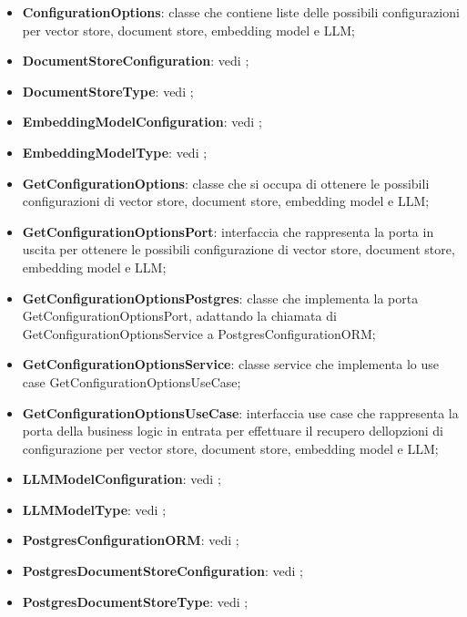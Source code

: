 \documentclass[10pt, a4paper]{article}
\begin{document}
       
\begin{itemize}
    \item \label{ConfigurationOptions}\textbf{ConfigurationOptions}: classe che contiene liste delle possibili configurazioni per vector store, document store, embedding model e LLM;
    \item \textbf{DocumentStoreConfiguration}: vedi ;
    \item \textbf{DocumentStoreType}: vedi ;
    \item \textbf{EmbeddingModelConfiguration}: vedi ;
    \item \textbf{EmbeddingModelType}: vedi ;
    \item \label{GetConfigurationOptions}\textbf{GetConfigurationOptions}: classe che si occupa di ottenere le possibili configurazioni di vector store, document store, embedding model e LLM; 
    
     \item \label{GetConfigurationOptionsPort}\textbf{GetConfigurationOptionsPort}: interfaccia che rappresenta la porta in uscita per ottenere le possibili configurazione di vector store, document store, embedding model e LLM;
    \item \label{GetConfigurationOptionsPostgres}\textbf{GetConfigurationOptionsPostgres}: classe che implementa la porta GetConfigurationOptionsPort, adattando la chiamata di GetConfigurationOptionsService a PostgresConfigurationORM;
    \item \label{GetConfigurationOptionsService}\textbf{GetConfigurationOptionsService}: classe service che implementa lo use case GetConfigurationOptionsUseCase;
    \item \label{GetConfigurationOptionsUseCase}\textbf{GetConfigurationOptionsUseCase}: interfaccia use case che rappresenta la porta della business logic in entrata per effettuare il recupero dellopzioni di configurazione per vector store, document store, embedding model e LLM; 
    \item \textbf{LLMModelConfiguration}: vedi ;
    \item \textbf{LLMModelType}: vedi ;
    \item \textbf{PostgresConfigurationORM}: vedi ;
    \item \textbf{PostgresDocumentStoreConfiguration}: vedi ;
    \item \textbf{PostgresDocumentStoreType}: vedi ;


\end{itemize}
\end{document}
